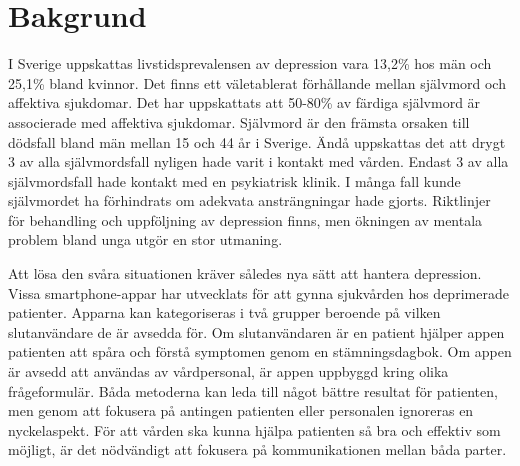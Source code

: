 \documentclass[12pt,a4paper,oneside]{article}
\let\oldcite\cite
\renewcommand*\cite[1]{\textsuperscript{\oldcite{#1}}}
\begin{document}
\begin{abstract}
\ \\\vspace{-2em}\ \\
\bfseries{
H{\"a}lso- och sjukv{\aa}rden beh{\"o}ver nya, kostnadseffektiva verktyg. Hur skulle h{\"a}lso- och sjukv{\aa}rden p{\aa}verkas om prim{\"a}rv{\aa}rden skulle f{\aa} resultat av fr{\aa}geformul{\"a}r fr{\aa}n patientens smartphone? Intervjuer om detta {\"a}mne har utf{\"o}rts med fokusgrupper som inneh{\aa}ller prim{\"a}rv{\aa}rdspersonal p{\aa} Hagfors v{\aa}rdcentral. Inspelningarna unders{\"o}ktes med kvalitativ inneh{\aa}llsanalys. Projektet visar att digitala fr{\aa}geformul{\"a}r har potentialer vid screening och uppf{\"o}ljning.
}
\end{abstract}

\section*{Bakgrund}
I Sverige uppskattas livstidsprevalensen av depression vara 13,2\% hos m{\"a}n och 25,1\% bland kvinnor\cite{numbers0}. Det finns ett v{\"a}letablerat f{\"o}rh{\aa}llande mellan sj{\"a}lvmord och affektiva sjukdomar\cite{numbers1.1}. Det har uppskattats att 50-80\% av f{\"a}rdiga sj{\"a}lvmord {\"a}r associerade med affektiva sjukdomar\cite{numbers1.1}. Sj{\"a}lvmord {\"a}r den fr{\"a}msta orsaken till d{\"o}dsfall bland m{\"a}n mellan 15 och 44 {\aa}r i Sverige\cite{numbers3.0.1}. {\"A}nd{\aa} uppskattas det att drygt  {3} av alla sj{\"a}lvmordsfall nyligen hade varit i kontakt med v{\aa}rden. Endast  {3} av alla sj{\"a}lvmordsfall hade kontakt med en psykiatrisk klinik\cite{numbers2}. I m{\aa}nga fall kunde sj{\"a}lvmordet ha f{\"o}rhindrats om adekvata anstr{\"a}ngningar hade gjorts\cite{numbers1}. Riktlinjer f{\"o}r behandling och uppf{\"o}ljning av depression finns, men {\"o}kningen av mentala problem bland unga utg{\"o}r en stor utmaning\cite{guide1, regionjh1}.

Att l{\"o}sa den sv{\aa}ra situationen kr{\"a}ver s{\aa}ledes nya s{\"a}tt att hantera depression. Vissa smartphone-appar har utvecklats f{\"o}r att gynna sjukv{\aa}rden hos deprimerade patienter. Apparna kan kategoriseras i tv{\aa} grupper beroende p{\aa} vilken slutanv{\"a}ndare de {\"a}r avsedda f{\"o}r. Om slutanv{\"a}ndaren {\"a}r en patient hj{\"a}lper appen patienten att sp{\aa}ra och f{\"o}rst{\aa} symptomen genom en st{\"a}mningsdagbok\cite {app1}. Om appen {\"a}r avsedd att anv{\"a}ndas av v{\aa}rdpersonal, {\"a}r appen uppbyggd kring olika fr{\aa}geformul{\"a}r\cite {app2}. B{\aa}da metoderna kan leda till n{\aa}got b{\"a}ttre resultat f{\"o}r patienten, men genom att fokusera p{\aa} antingen patienten eller personalen ignoreras en nyckelaspekt. F{\"o}r att v{\aa}rden ska kunna hj{\"a}lpa patienten s{\aa} bra och effektiv som m{\"o}jligt, {\"a}r det n{\"o}dv{\"a}ndigt att fokusera p{\aa} kommunikationen mellan b{\aa}da parter.
\end{document}
